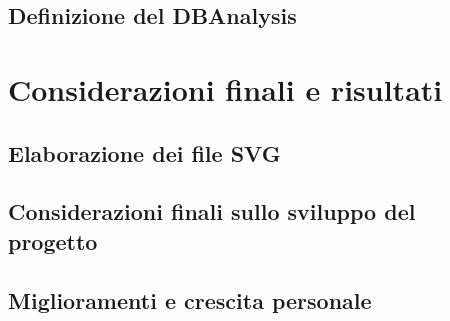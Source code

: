 \documentclass[12pt]{report}
\begin{document}
\newpage
\section{Definizione del DBAnalysis}


\chapter{Considerazioni finali e risultati}
\label{cap3}

\section{Elaborazione dei file SVG}

\newpage
\section{Considerazioni finali sullo sviluppo del progetto}

\newpage
\section{Miglioramenti e crescita personale}


%
%

%
%
\begin{thebibliography}{00}
%
\bibitem{}

%
\end{thebibliography}
% 
\end{document}

